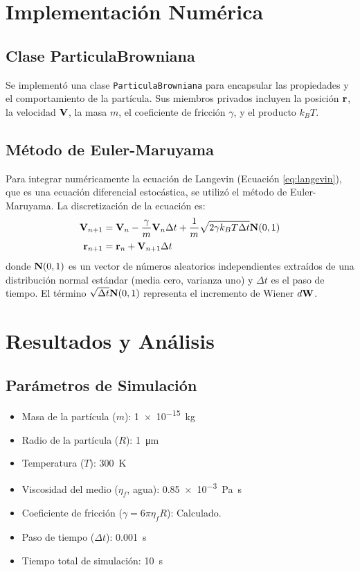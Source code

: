\documentclass[11pt,a4paper]{article}
\begin{document}
\section{Implementación Numérica}
\subsection{Clase ParticulaBrowniana}
Se implementó una clase \texttt{ParticulaBrowniana} para encapsular las propiedades y el comportamiento de la partícula. Sus miembros privados incluyen la posición $\vb{r}$, la velocidad $\vb{V}$, la masa $m$, el coeficiente de fricción $\gamma$, y el producto $k_B T$.

\subsection{Método de Euler-Maruyama}
Para integrar numéricamente la ecuación de Langevin (Ecuación \ref{eq:langevin}), que es una ecuación diferencial estocástica, se utilizó el método de Euler-Maruyama. La discretización de la ecuación es:
\begin{align}
    \vb{V}_{n+1} &= \vb{V}_n - \frac{\gamma}{m}\vb{V}_n \Delta t + \frac{1}{m}\sqrt{2\gamma k_B T \Delta t} \vb{N}(0,1) \\
    \vb{r}_{n+1} &= \vb{r}_n + \vb{V}_{n+1} \Delta t
\end{align}
donde $\vb{N}(0,1)$ es un vector de números aleatorios independientes extraídos de una distribución normal estándar (media cero, varianza uno) y $\Delta t$ es el paso de tiempo. El término $\sqrt{\Delta t} \vb{N}(0,1)$ representa el incremento de Wiener $d\vb{W}$.

\section{Resultados y Análisis}
\subsection{Parámetros de Simulación}
\begin{itemize}
    \item Masa de la partícula ($m$): \SI{1e-15}{\kilo\gram}
    \item Radio de la partícula ($R$): \SI{1}{\micro\meter}
    \item Temperatura ($T$): \SI{300}{\kelvin}
    \item Viscosidad del medio ($\eta_f$, agua): \SI{0.85e-3}{\pascal\second}
    \item Coeficiente de fricción ($\gamma = 6\pi\eta_f R$): Calculado.
    \item Paso de tiempo ($\Delta t$): \SI{0.001}{\second}
    \item Tiempo total de simulación: \SI{10}{\second}
\end{itemize}
\end{document}
